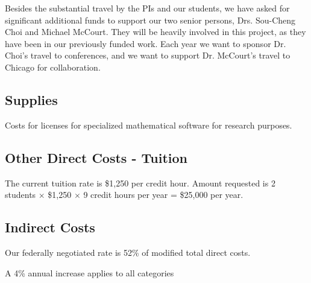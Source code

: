 \documentclass[11pt]{NSFamsart}
\begin{document}
Besides the substantial travel by the PIs and our students, we have asked for significant additional funds to support our two senior persons, Drs. Sou-Cheng Choi and Michael McCourt.  They will be heavily involved in this project, as they have been in our previously funded work.  Each year we want to sponsor Dr. Choi's travel to conferences, and we want to support Dr. McCourt's travel to Chicago for collaboration.

\subsection*{Supplies}
Costs for licenses for specialized mathematical software for research purposes.

\subsection*{Other Direct Costs - Tuition}
The current tuition rate is \$1,250 per credit hour. Amount requested is 2 students $\times$
\$1,250 $\times$ 9 credit hours per year = \$25,000 per year.

\subsection*{Indirect Costs}
Our federally negotiated rate is 52\% of modified total direct costs.

A 4\% annual increase applies to all categories
\end{document}

